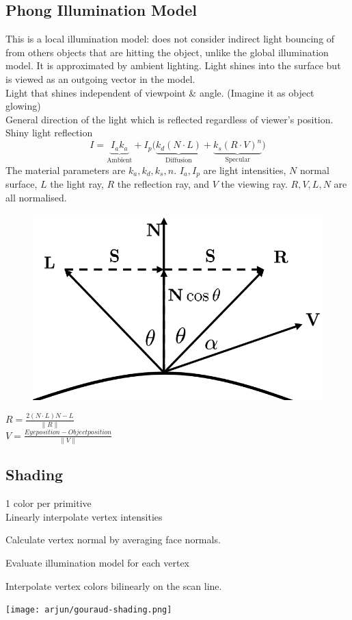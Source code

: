 \subsection*{Phong Illumination Model}
This is a local illumination model: does not consider indirect light bouncing of from others objects that are hitting the object, unlike the global illumination model. It is approximated by ambient lighting.
Light shines into the surface but is viewed as an outgoing vector in the model.\\
 Light that shines independent of viewpoint \& angle. (Imagine it as object glowing) \\
 General direction of the light which is reflected regardless of viewer's position.\\
 Shiny light reflection
$$I = \underbrace{I_ak_a }_\text{Ambient} + I_p \bigl( \underbrace{k_d(N \cdot L)}_\text{Diffusion} + \underbrace{k_s(R \cdot V)^n}_\text{Specular} \bigr)$$
The material parameters are $k_a, k_d, k_s, n$. $I_a, I_p$ are light intensities, $N$ normal surface, $L$ the light ray, $R$ the reflection ray, and $V$ the viewing ray. $R, V, L, N$ are all normalised. 
\begin{figure}
    \includegraphics[width = 0.4\columnwidth]{assets/arjun/phong-illumination.png}
\end{figure}

$R = \frac{2(N \cdot L)N - L}{\lVert R \rVert} $ \\
$V = \frac{Eye position - Object position}{\lVert V \rVert} $

\subsection*{Shading}
 1 color per primitive \\
 Linearly interpolate vertex intensities
\begin{compactenum}
    \item Calculate vertex normal by averaging face normals.
    \item Evaluate illumination model for each vertex
    \item Interpolate vertex colors bilinearly on the scan line.
\end{compactenum}
\begin{center}
    \texttt{[image: arjun/gouraud-shading.png]}
\end{center}

